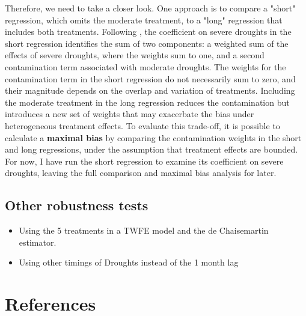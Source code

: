 \documentclass[12pt, oneside]{article}      %
\begin{document}
Therefore, we need to take a closer look. One approach is to compare a "short" regression, which omits the moderate treatment, to a "long" regression that includes both treatments. Following \cite{deChaisemartin2023}, the coefficient on severe droughts in the short regression identifies the sum of two components: a weighted sum of the effects of severe droughts, where the weights sum to one, and a second contamination term associated with moderate droughts. The weights for the contamination term in the short regression do not necessarily sum to zero, and their magnitude depends on the overlap and variation of treatments. Including the moderate treatment in the long regression reduces the contamination but introduces a new set of weights that may exacerbate the bias under heterogeneous treatment effects. To evaluate this trade-off, it is possible to calculate a \textbf{maximal bias} by comparing the contamination weights in the short and long regressions, under the assumption that treatment effects are bounded. For now, I have run the short regression to examine its coefficient on severe droughts, leaving the full comparison and maximal bias analysis for later.

\subsection{Other robustness tests}

\begin{itemize}
    \item Using the 5 treatments in a TWFE model and the de Chaisemartin estimator.
    \item Using other timings of Droughts instead of the 1 month lag
\end{itemize}






\newpage
\clearpage
 
\section*{References}
\nocite{*}
\begingroup
\singlespacing
\renewcommand{\section}[2]{}%
\begin{spacing}{2}

\end{spacing}
\endgroup
\clearpage



\appendix
\clearpage
\newpage
\section*{Appendix}
\setcounter{figure}{0} \renewcommand{\thefigure}{A.\arabic{figure}}
\setcounter{table}{0} \renewcommand{\thetable}{A.\arabic{table}}
\end{document}
